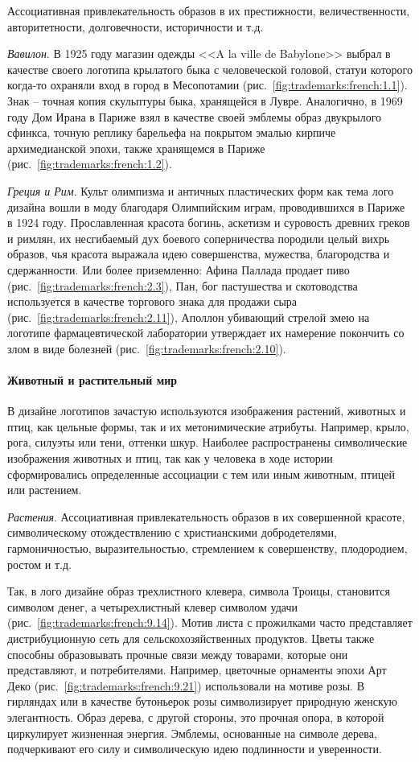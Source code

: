 Ассоциативная привлекательность образов в их престижности, величественности,
авторитетности, долговечности, историчности и т.д.

\emph{Вавилон}. В 1925 году магазин одежды <<A la ville de Babylone>> выбрал в качестве своего логотипа крылатого быка с человеческой головой, статуи которого когда-то охраняли вход в город в
  Месопотамии (рис.~\ref{fig:trademarks:french:1.1}).  Знак -- точная копия скульптуры быка, хранящейся в
  Лувре. Аналогично, в 1969 году Дом Ирана в Париже взял в качестве своей эмблемы образ двукрылого
  сфинкса, точную реплику барельефа на покрытом эмалью кирпиче архимедианской эпохи, также хранящемся
  в Париже (рис.~\ref{fig:trademarks:french:1.2}).

\emph{Греция и Рим}. Культ олимпизма и античных пластических форм как тема лого дизайна вошли в моду
  благодаря Олимпийским играм, проводившихся в Париже в 1924 году. Прославленная красота богинь,
  аскетизм и суровость древних греков и римлян, их несгибаемый дух боевого соперничества породили
  целый вихрь образов, чья красота выражала идею совершенства, мужества, благородства и
  сдержанности. Или более приземленно: Афина Паллада продает пиво (рис.~\ref{fig:trademarks:french:2.3}),
  Пан, бог пастушества и скотоводства используется в качестве торгового знака для продажи сыра
  (рис.~\ref{fig:trademarks:french:2.11}), Аполлон убивающий стрелой
  змею на логотипе фармацевтической лаборатории утверждает их намерение покончить со злом в виде
  болезней (рис.~\ref{fig:trademarks:french:2.10}).

\paragraph{Животный и растительный мир}

В дизайне логотипов зачастую используются изображения растений, животных и птиц,
как цельные формы, так и их метонимические атрибуты. Например, крыло, рога,
силуэты или тени, оттенки шкур. Наиболее распространены символические изображения
животных и птиц, так как у человека в ходе истории сформировались определенные
ассоциации с тем или иным животным, птицей или растением.

\emph{Растения}. Ассоциативная привлекательность образов в их совершенной
  красоте, символическому отождествлению с христианскими добродетелями,
  гармоничностью, выразительностью, стремлением к совершенству, плодородием,
  ростом и т.д.

  Так, в лого дизайне образ трехлистного клевера, символа Троицы, становится
  символом денег, а четырехлистный клевер символом удачи
  (рис.~\ref{fig:trademarks:french:9.14}). Мотив листа с прожилками часто
  представляет дистрибуционную сеть для сельскохозяйственных продуктов. Цветы
  также способны образовывать прочные связи между товарами, которые они
  представляют, и потребителями. Например, цветочные орнаменты эпохи Арт Деко
  (рис.~\ref{fig:trademarks:french:9.21}) использовали на мотиве розы.  В
  гирляндах или в качестве бутоньерок розы символизирует природную женскую
  элегантность. Образ дерева, с другой стороны, это прочная опора, в которой
  циркулирует жизненная энергия. Эмблемы, основанные на символе дерева,
  подчеркивают его силу и символическую идею подлинности и уверенности.

